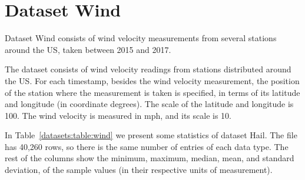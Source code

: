 
\section{Dataset Wind}
\label{datasets:wind}

\vspace{-5pt}
Dataset Wind \cite{dataset:spc} consists of wind velocity measurements from several stations around the US, taken between 2015 and 2017. \SPCDef


The dataset consists of wind velocity readings from stations distributed around the US. For each timestamp, besides the wind velocity measurement, the position of the station where the measurement is taken is specified, in terms of its latitude and longitude (in coordinate degrees). The scale of the latitude and longitude is 100. The wind velocity is measured in mph, and its scale is 10.


In Table~\ref{datasets:table:wind} we present some statistics of dataset Hail. \SPCTable The file has 40,260 rows, so there is the same number of entries of each data type. The rest of the columns show the minimum, maximum, median, mean, and standard deviation, of the sample values (in their respective units of measurement).


